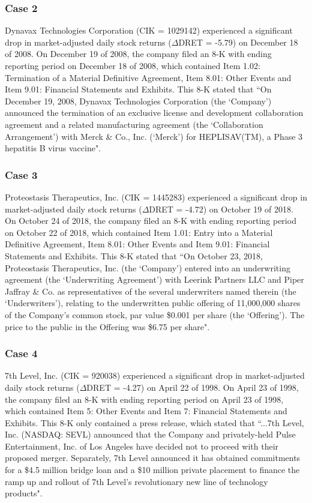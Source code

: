 \subsubsection*{Case 2}
Dynavax Technologies Corporation (CIK = 1029142) experienced a significant drop in market-adjusted daily stock returns ($\Delta$DRET = -5.79) on December 18 of 2008. On December 19 of 2008, the company filed an 8-K with ending reporting period on December 18 of 2008, which contained Item 1.02: Termination of a Material Definitive Agreement, Item 8.01: Other Events and Item 9.01: Financial Statements and Exhibits. This 8-K stated that ``On December 19, 2008, Dynavax Technologies Corporation (the `Company') announced the termination of an exclusive license and development collaboration agreement and a related manufacturing agreement (the `Collaboration Arrangement') with Merck \& Co., Inc. (`Merck') for HEPLISAV(TM), a Phase 3 hepatitis B virus vaccine". 
\subsubsection*{Case 3}
Proteostasis Therapeutics, Inc. (CIK = 1445283) experienced a significant drop in market-adjusted daily stock returns ($\Delta$DRET = -4.72) on October 19 of 2018. On October 24 of 2018, the company filed an 8-K with ending reporting period on October 22 of 2018, which contained Item 1.01: Entry into a Material Definitive Agreement, Item 8.01: Other Events and Item 9.01: Financial Statements and Exhibits. This 8-K stated that ``On October 23, 2018, Proteostasis Therapeutics, Inc. (the `Company') entered into an underwriting agreement (the `Underwriting Agreement') with Leerink Partners LLC and Piper Jaffray \& Co. as representatives of the several underwriters named therein (the `Underwriters'), relating to the underwritten public offering of 11,000,000 shares of the Company’s common stock, par value \$0.001 per share (the `Offering'). The price to the public in the Offering was \$6.75 per share". 
\subsubsection*{Case 4}
7th Level, Inc. (CIK = 920038) experienced a significant drop in market-adjusted daily stock returns ($\Delta$DRET = -4.27) on April 22 of 1998. On April 23 of 1998, the company filed an 8-K with ending reporting period on April 23 of 1998, which contained Item 5: Other Events and Item 7: Financial Statements and Exhibits. This 8-K only contained a press release, which stated that ``...7th Level, Inc. (NASDAQ: SEVL) announced that the Company and privately-held Pulse Entertainment, Inc. of Los Angeles have decided not to proceed with their proposed merger.  Separately, 7th Level announced it has obtained commitments for a \$4.5 million bridge loan and a \$10 million private placement to finance the ramp up and rollout of 7th Level's revolutionary new line of technology products".
